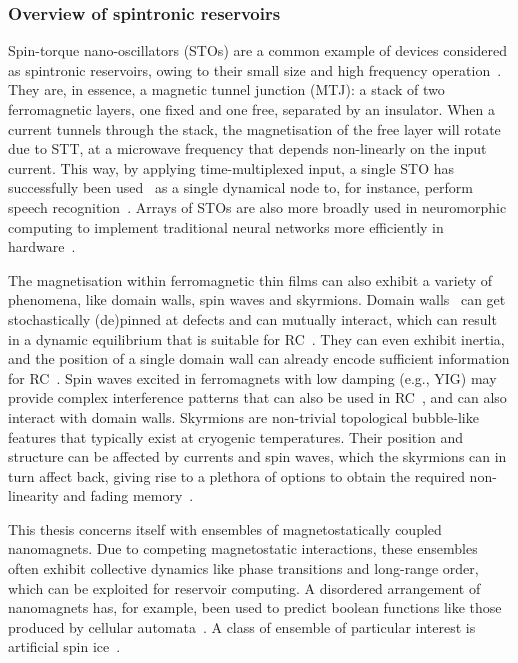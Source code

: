 \subsubsection{Overview of spintronic reservoirs}
Spin-torque nano-oscillators (STOs) are a common example of devices considered as spintronic reservoirs, owing to their small size and high frequency operation~\cite{tsunegi2019STOforcedsyncRC}.
They are, in essence, a magnetic tunnel junction (MTJ): a stack of two ferromagnetic layers, one fixed and one free, separated by an insulator.
When a current tunnels through the stack, the magnetisation of the free layer will rotate due to STT, at a microwave frequency that depends non-linearly on the input current.
This way, by applying time-multiplexed input, a single STO has successfully been used~\cite{tsunegi2019STOforcedsyncRC} as a single dynamical node to, for instance, perform speech recognition~\cite{STO_RC_Riou2021,NeuromorphicOscillators}.
Arrays of STOs are also more broadly used in neuromorphic computing to implement traditional neural networks more efficiently in hardware~\cite{VowelRecognition4STO}. \par
The magnetisation within ferromagnetic thin films can also exhibit a variety of phenomena, like domain walls, spin waves and skyrmions.
Domain walls~\cite{Venkat_2024} can get stochastically (de)pinned at defects and can mutually interact, which can result in a dynamic equilibrium that is suitable for RC~\cite{DynamicEmergence_NanomagneticSystem}.
They can even exhibit inertia, and the position of a single domain wall can already encode sufficient information for RC~\cite{RC_DW}.
Spin waves excited in ferromagnets with low damping (e.g., YIG) may provide complex interference patterns that can also be used in RC~\cite{RC_SpinWaveInterference}, and can also interact with domain walls.
Skyrmions are non-trivial topological bubble-like features that typically exist at cryogenic temperatures.
Their position and structure can be affected by currents and spin waves, which the skyrmions can in turn affect back, giving rise to a plethora of options to obtain the required non-linearity and fading memory~\cite{RC_TaskAgnosticMetrics_v2,RC_SkyrmionCrystalSW}. \par
This thesis concerns itself with ensembles of magnetostatically coupled nanomagnets.
Due to competing magnetostatic interactions, these ensembles often exhibit collective dynamics like phase transitions and long-range order, which can be exploited for reservoir computing.
A disordered arrangement of nanomagnets has, for example, been used to predict boolean functions like those produced by cellular automata~\cite{RC_PassiveFrustratedNM,RC_DipoleNanomagnets}. %
A class of ensemble of particular interest is artificial spin ice~\cite{RC_ASI}.


